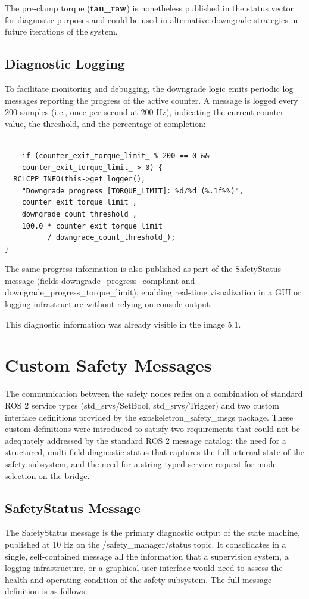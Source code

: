 The pre-clamp torque (\textbf{tau\_raw}) is nonetheless published in the status vector for diagnostic purposes and could be used in alternative downgrade strategies in future iterations of the system.

\subsection{Diagnostic Logging}
To facilitate monitoring and debugging, the downgrade logic emits periodic log messages reporting the progress of the active counter. A message is logged every 200 samples (i.e., once per second at 200 Hz), indicating the current counter value, the threshold, and the percentage of completion:

\begin{verbatim}

    if (counter_exit_torque_limit_ % 200 == 0 &&
    counter_exit_torque_limit_ > 0) {
  RCLCPP_INFO(this->get_logger(),
    "Downgrade progress [TORQUE_LIMIT]: %d/%d (%.1f%%)",
    counter_exit_torque_limit_,
    downgrade_count_threshold_,
    100.0 * counter_exit_torque_limit_
          / downgrade_count_threshold_);
}

\end{verbatim}

The same progress information is also published as part of the SafetyStatus message (fields downgrade\_progress\_compliant and downgrade\_progress\_torque\_limit), enabling real-time visualization in a GUI or logging infrastructure without relying on console output.

This diagnostic information was already visible in the image 5.1.



\section{Custom Safety Messages}
The communication between the safety nodes relies on a combination of standard ROS 2 service types (std\_srvs/SetBool, std\_srvs/Trigger) and two custom interface definitions provided by the exoskeletron\_safety\_msgs package. These custom definitions were introduced to satisfy two requirements that could not be adequately addressed by the standard ROS 2 message catalog: the need for a structured, multi-field diagnostic status that captures the full internal state of the safety subsystem, and the need for a string-typed service request for mode selection on the bridge.

\subsection{SafetyStatus Message}
The SafetyStatus message is the primary diagnostic output of the state machine, published at 10 Hz on the /safety\_manager/status topic. It consolidates in a single, self-contained message all the information that a supervision system, a logging infrastructure, or a graphical user interface would need to assess the health and operating condition of the safety subsystem. The full message definition is as follows:

